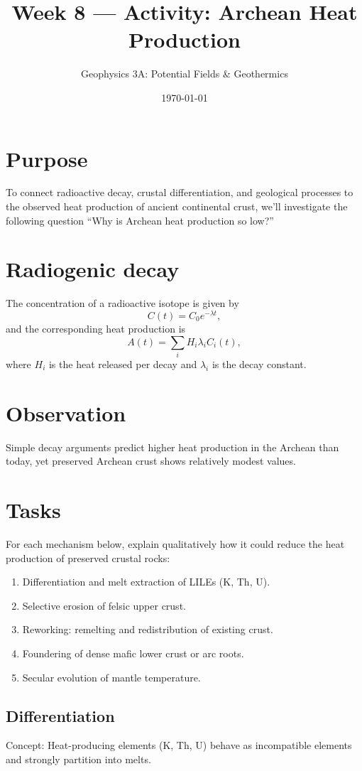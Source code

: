 \documentclass[11pt,a4paper]{article}
\title{Week 8 --- Activity: Archean Heat Production}
\author{Geophysics 3A: Potential Fields \& Geothermics}
\date{\today}
\begin{document}
\maketitle

\section*{Purpose}

To connect radioactive decay, crustal differentiation, and geological processes to the observed heat production of ancient continental crust, we'll investigate the following question ``Why is Archean heat production so low?''

\section*{Radiogenic decay}
The concentration of a radioactive isotope is given by
\[
C(t) = C_0 e^{-\lambda t},
\]
and the corresponding heat production is
\[
A(t) = \sum_i H_i \lambda_i C_i(t),
\]
where $H_i$ is the heat released per decay and $\lambda_i$ is the decay constant.

\section*{Observation}
Simple decay arguments predict higher heat production in the Archean than today, yet preserved Archean crust shows relatively modest values.


\section*{Tasks}
For each mechanism below, explain qualitatively how it could reduce the heat
production of preserved crustal rocks:
\begin{enumerate}
  \item Differentiation and melt extraction of LILEs (K, Th, U).
  \item Selective erosion of felsic upper crust.
  \item Reworking: remelting and redistribution of existing crust.
  \item Foundering of dense mafic lower crust or arc roots.
  \item Secular evolution of mantle temperature.
\end{enumerate}

\subsection*{Differentiation}
Concept: Heat-producing elements (K, Th, U) behave as incompatible elements and strongly partition into melts.
\end{document}
